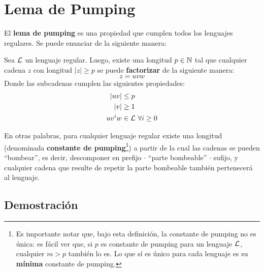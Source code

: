 \section{Lema de Pumping}
\label{pumping-regulares}

El \textbf{lema de pumping} es una propiedad que cumplen todos los lenguajes regulares. Se puede enunciar de la siguiente manera:

\begin{theorem*}
    Sea $\mathcal{L}$ un lenguaje regular. Luego, existe una longitud $p \in \mathbb{N}$ tal que cualquier cadena $z$ con longitud $|z| \geq p$ se puede \textbf{factorizar} de la siguiente manera:
    $$
        z = u v w
    $$
    Donde las subcadenas cumplen las siguientes propiedades:
    $$
        \begin{aligned}
            |uv|    & \leq p                    \\
            |v|     & \geq 1                    \\
            u v^i w & \in \mathcal{L} \ \forall i \geq 0
        \end{aligned}
    $$
\end{theorem*}

En otras palabras, para cualquier lenguaje regular existe una longitud (denominada \textbf{constante de pumping}\footnote{Es importante notar que, bajo esta definición, la constante de pumping no es única: es fácil ver que, si $p$ es constante de pumping para un lenguaje $\mathcal{L}$, cualquier $m > p$ también lo es. Lo que sí es único para cada lenguaje es su \textbf{mínima} constante de pumping.}) a partir de la cual las cadenas se pueden ``bombear'', es decir, descomponer en prefijo $\cdot$ ``parte bombeable'' $\cdot$ sufijo, y cualquier cadena que resulte de repetir la parte bombeable también pertenecerá al lenguaje.

\subsection{Demostración}

